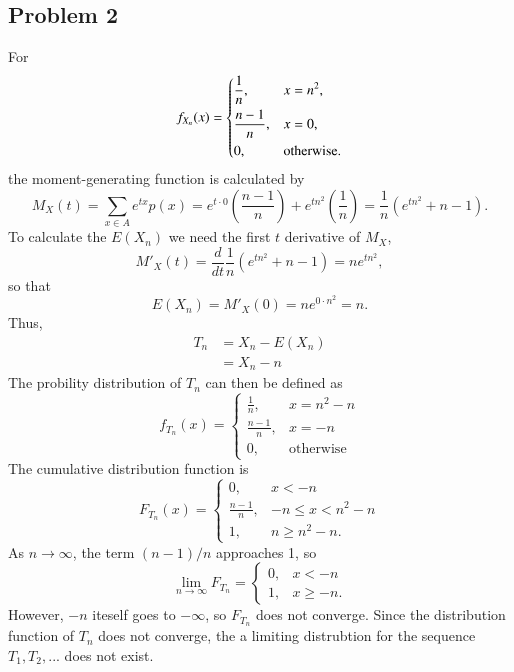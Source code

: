 \documentclass{article}
\begin{document}
\subsection*{Problem 2}
For 
\[f_{X_n}(x) = \begin{dcases}
\frac{1}{n}, &x = n^2, \\
\frac{n-1}{n}, &x = 0, \\
0, &\textrm{otherwise}. 
\end{dcases}\]
the moment-generating function is calculated by \[M_X(t) = \sum_{x\in A}e^{tx}p(x) = e^{t\cdot 0}\left(\frac{n-1}{n}\right) + e^{tn^2}\left(\frac{1}{n}\right) = \frac{1}{n}\left(e^{tn^2} + n - 1\right).\] To calculate the $E(X_n)$ we need the first $t$ derivative of $M_X$, \[M'_X(t) = \frac{d}{dt}\frac{1}{n}\left(e^{tn^2} + n - 1\right) = ne^{tn^2},\] so that \[E(X_n) = M'_X(0) = ne^{0\cdot n^2} = n.\]
Thus,
\[\begin{aligned}
T_n &= X_n - E(X_n) \\
&= X_n - n
\end{aligned}\]
The probility distribution of $T_n$ can then be defined as 
\[f_{T_n}(x) = \begin{cases}
\frac{1}{n}, &x = n^2 - n \\
\frac{n-1}{n}, &x = -n \\
0, &\text{otherwise}
\end{cases}\]
The cumulative distribution function is 
\[F_{T_n}(x) = \begin{cases}
0, & x < -n \\
\frac{n-1}{n}, & -n \leq x < n^2 - n \\
1, &n \geq n^2 - n.
\end{cases}\]
As $n\to\infty$, the term $(n-1)/n$ approaches 1, so
\[\lim_{n\to\infty} F_{T_n} = \begin{cases}
0, &x < -n \\
1, &x \geq -n. \end{cases}\]
However, $-n$ iteself goes to $-\infty$, so $F_{T_n}$ does not converge. Since the distribution function of $T_n$ does not converge, the a limiting distrubtion for the sequence $T_1, T_2, ...$ does not exist.

\iffalse
For $T_n = X_n - E(X_n)$, \[\lim_{n\to\infty} T_n = \lim_{n\to\infty} X_n - \lim_{n\to\infty} E(X_n).\] $E(X) = n$ therefore $E(X)$ approaches infinity. For $X_n$, the probability that $x=n^2$ is $1/n$ and approaches zero. The probability that $x=0$ approaches $1$. Then  \[\lim_{n\to\infty} T_n = \lim_{n\to\infty} X_n - \lim_{n\to\infty} E(X_n) = 0 - \infty = -\infty.\] Therefore, there is no limiting distribution for $f_X$. 
\fi
\end{document}
